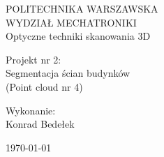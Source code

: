 \begin{titlepage}
    \begin{center}
        
    \vspace{1cm}%
    \LARGE
    POLITECHNIKA WARSZAWSKA\\
    WYDZIAŁ MECHATRONIKI\\
    
    \vspace{2cm}
    \Large
    Optyczne techniki skanowania 3D
    
    \vspace{5cm}
    \LARGE
    Projekt nr 2:\\
    Segmentacja ścian budynków\\
    \large
    (Point cloud nr 4)\\
    
    \vspace{4cm}
    \Large
    \begin{flushright}
        Wykonanie:\\
        Konrad Bedełek\\
    \end{flushright}
    
    \vfill
    \today%
    \end{center}
\end{titlepage}